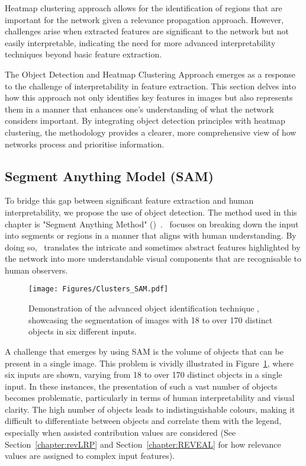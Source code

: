 Heatmap clustering approach allows for the identification of regions that are important for the network given a relevance propagation approach. However, challenges arise when extracted features are significant to the network but not easily interpretable, indicating the need for more advanced interpretability techniques beyond basic feature extraction.

The Object Detection and Heatmap Clustering Approach emerges as a response to the challenge of interpretability in feature extraction. This section delves into how this approach not only identifies key features in images but also represents them in a manner that enhances one's understanding of what the network considers important. By integrating object detection principles with heatmap clustering, the methodology provides a clearer, more comprehensive view of how networks process and prioritise information. 

\subsection{Segment Anything Model (SAM)}
To bridge this gap between significant feature extraction and human interpretability, we propose the use of object detection. The method used in this chapter is "Segment Anything Method" (\SAM)~\cite{Kirillov2023SegmentA}. \SAM\ focuses on breaking down the input into segments or regions in a manner that aligns with human understanding. By doing so, \SAM\ translates the intricate and sometimes abstract features highlighted by the network into more understandable visual components that are recognisable to human observers. 

\begin{figure}[ht!]
\begin{center}
\texttt{[image: Figures/Clusters\_SAM.pdf]}
\end{center}
\caption{Demonstration of the advanced object identification technique \SAM\/, showcasing the segmentation of images with 18 to over 170 distinct objects in six different inputs.}
\label{Fig:Sam_many_masks}
\end{figure} 

A challenge that emerges by using SAM is the volume of objects that can be present in a single image. This problem is vividly illustrated in Figure~\ref{Fig:Sam_many_masks}, where six inputs are shown, varying from 18 to over 170 distinct objects in a single input. In these instances, the presentation of such a vast number of objects becomes problematic, particularly in terms of human interpretability and visual clarity. The high number of objects leads to indistinguishable colours, making it difficult to differentiate between objects and correlate them with the legend, especially when assisted contribution values are considered (See  Section~\ref{chapter:revLRP} and Section~\ref{chapter:REVEAL} for how relevance values are assigned to complex input features).

